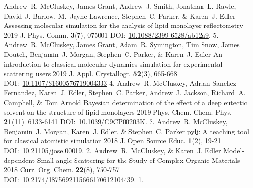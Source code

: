 \begin{cvpubys}
  \cvpuby
    {Andrew~R. McCluskey, James Grant, Andrew~J. Smith, Jonathan~L. Rawle, David~J. Barlow, M.~Jayne Lawrence, Stephen~C. Parker, \& Karen~J. Edler}
    {Assessing molecular simulation for the analysis of lipid monolayer reflectometry}
    {2019}
    {J. Phys. Comm.}
    {\textbf{3}(7), 075001}
    {DOI:~\href{https://doi.org/10.1088/2399-6528/ab12a9}{10.1088/2399-6528/ab12a9}.}
    {5.}
  \cvpuby
    {Andrew~R. McCluskey, James Grant, Adam~R. Symington, Tim Snow, James Doutch, Benjamin~J. Morgan, Stephen~C. Parker, \& Karen~J. Edler}
    {An introduction to classical molecular dynamics simulation for experimental scattering users}
    {2019}
    {J. Appl. Crystallogr.}
    {\textbf{52}(3), 665-668}
    {DOI:~\href{https://doi.org/10.1107/S1600576719004333}{10.1107/S1600576719004333}}
    {4.}
  \cvpuby
    {Andrew~R. McCluskey, Adrian Sanchez-Fernandez, Karen~J. Edler, Stephen~C. Parker, Andrew~J. Jackson, Richard~A. Campbell, \& Tom Arnold}
    {Bayesian determination of the effect of a deep eutectic solvent on the structure of lipid monolayers}
    {2019}
    {Phys. Chem. Chem. Phys.}
    {\textbf{21}(11), 6133-6141}
    {DOI:~\href{https://doi.org/10.1039/C9CP00203K}{10.1039/C9CP00203K}.}
    {3.}
  \cvpuby
    {Andrew~R. McCluskey, Benjamin~J. Morgan, Karen~J. Edler, \& Stephen~C. Parker}
    {pylj: A teaching tool for classical atomistic simulation}
    {2018}
    {J. Open Source Educ.}
    {\textbf{1}(2), 19-21}
    {DOI:~\href{http://doi.org/10.21105/jose.00019}{10.21105/jose.00019}.}
    {2.}
  \cvpuby
    {Andrew~R.~McCluskey, \& Karen~J. Edler}
    {Model-dependent Small-angle Scattering for the Study of Complex Organic Materials}
    {2018}
    {Curr. Org. Chem.}
    {\textbf{22}(8), 750-757}
    {DOI:~\href{http://doi.org/10.2174/1875692115666170612104439}{10.2174/1875692115666170612104439}.}
    {1.}
\end{cvpubys}
